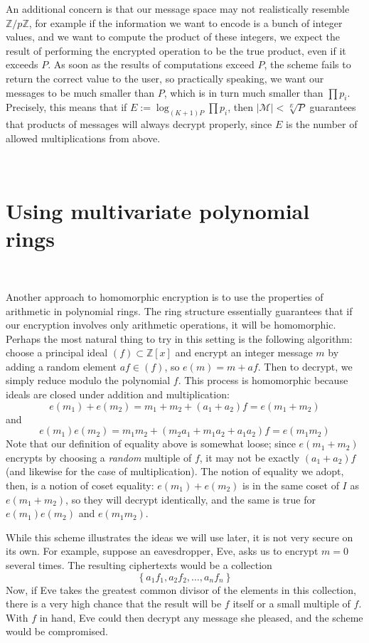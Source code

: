 \documentclass[11pt]{report}
\newcommand{\M}{\mathcal{M}}
\newcommand{\Zp}{\mathbb{Z}/p\mathbb{Z}}
\newcommand{\Zx}{\mathbb{Z}[x]}
\begin{document}
An additional concern is that our message space may not realistically resemble $\Zp$, for example if the information we want to encode is a bunch of integer values, and we want to compute the product of these integers, we expect the result of performing the encrypted operation to be the true product, even if it exceeds $P$. As soon as the results of computations exceed $P$, the scheme fails to return the correct value to the user, so practically speaking, we want our messages to be much smaller than $P$, which is in turn much smaller than $\prod p_i$. Precisely, this means that if $E := \log_{(K+1)P}\prod p_i$, then $|\M|<\sqrt[E]{P}$ guarantees that products of messages will always decrypt properly, since $E$ is the number of allowed multiplications from above.

\

\section{Using multivariate polynomial rings}
\label{sec:multicrypt}

\

Another approach to homomorphic encryption is to use the properties of arithmetic in polynomial rings. The ring structure essentially guarantees that if our encryption involves only arithmetic operations, it will be homomorphic. Perhaps the most natural thing to try in this setting is the following algorithm: choose a principal ideal $(f)\subset \Zx$ and encrypt an integer message $m$ by adding a random element $af\in (f)$, so $e(m) = m+af$. Then to decrypt, we simply reduce modulo the polynomial $f$. This process is homomorphic because ideals are closed under addition and multiplication: \[e(m_1)+e(m_2) = m_1+m_2+(a_1+a_2)f= e(m_1+m_2)\] and \[e(m_1)e(m_2) = m_1m_2+(m_2a_1+m_1a_2+a_1a_2)f = e(m_1m_2)\] Note that our definition of equality above is somewhat loose; since $e(m_1+m_2)$ encrypts by choosing a \emph{random} multiple of $f$, it may not be exactly $(a_1+a_2)f$ (and likewise for the case of multiplication). The notion of equality we adopt, then, is a notion of coset equality: $e(m_1)+e(m_2)$ is in the same coset of $I$ as $e(m_1+m_2)$, so they will decrypt identically, and the same is true for $e(m_1)e(m_2)$ and $e(m_1m_2)$.

While this scheme illustrates the ideas we will use later, it is not very secure on its own. For example, suppose an eavesdropper, Eve, asks us to encrypt $m=0$ several times. The resulting ciphertexts would be a collection \[\left\{ a_1f_1, a_2f_2,\dots ,a_nf_n\right\}\] Now, if Eve takes the greatest common divisor of the elements in this collection, there is a very high chance that the result will be $f$ itself or a small multiple of $f$. With $f$ in hand, Eve could then decrypt any message she pleased, and the scheme would be compromised.
\end{document}
